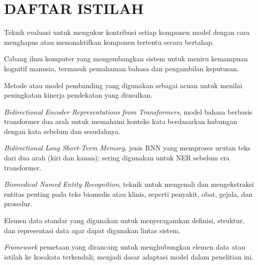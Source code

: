 \chapter*{DAFTAR ISTILAH}

{
\setlength{\parskip}{0pt}
\begin{description}
\setlength{\itemsep}{0.75\baselineskip}
\setlength{\parsep}{0pt}
\setlength{\topsep}{0pt}

    \item[\textit{Ablation study}] Teknik evaluasi untuk mengukur kontribusi setiap komponen model dengan cara menghapus atau menonaktifkan komponen tertentu secara bertahap.

    \item[AI (\textit{Artificial Intelligence})] Cabang ilmu komputer yang mengembangkan sistem untuk meniru kemampuan kognitif manusia, termasuk pemahaman bahasa dan pengambilan keputusan.

    \item[\textit{Baseline}] Metode atau model pembanding yang digunakan sebagai acuan untuk menilai peningkatan kinerja pendekatan yang diusulkan.

    \item[BERT] \textit{Bidirectional Encoder Representations from Transformers}, model bahasa berbasis transformer dua arah untuk memahami konteks kata berdasarkan hubungan dengan kata sebelum dan sesudahnya.

    \item[BiLSTM] \textit{Bidirectional Long Short-Term Memory}, jenis RNN yang memproses urutan teks dari dua arah (kiri dan kanan); sering digunakan untuk NER sebelum era transformer.

    \item[BioNER] \textit{Biomedical Named Entity Recognition}, teknik untuk mengenali dan mengekstraksi entitas penting pada teks biomedis atau klinis, seperti penyakit, obat, gejala, dan prosedur.

    \item[CDE (\textit{Common Data Element})] Elemen data standar yang digunakan untuk menyeragamkan definisi, struktur, dan representasi data agar dapat digunakan lintas sistem.

    \item[CDE-Mapper] \textit{Framework} pemetaan yang dirancang untuk menghubungkan elemen data atau istilah ke kosakata terkendali; menjadi dasar adaptasi model dalam penelitian ini.


\end{description}}
